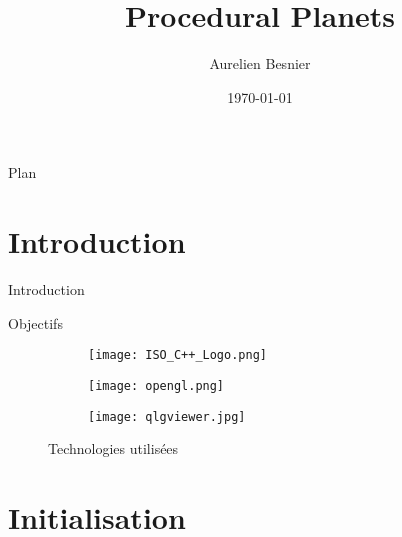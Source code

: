 \documentclass{beamer}
\title{Procedural Planets}
\author{Aurelien Besnier}
\date{\today}
\begin{document}
\maketitle

\begin{frame}{Plan}
    \tableofcontents
\end{frame}

\section{Introduction}

\begin{frame}{Introduction}

\begin{block}{Objectifs}

\end{block}

\begin{figure}[H]
        \begin{subfigure}[b]{0.25\textwidth}
                \centering
                \texttt{[image: ISO\_C++\_Logo.png]}
        \end{subfigure}%
        \begin{subfigure}[b]{0.25\textwidth}
                \centering
                \texttt{[image: opengl.png]}
        \end{subfigure}%
        \begin{subfigure}[b]{0.25\textwidth}
                \centering
                \texttt{[image: qlgviewer.jpg]}
        \end{subfigure}%
        \caption{Technologies utilisées}
\end{figure}
    
\end{frame}


\section{Initialisation}
\end{document}
